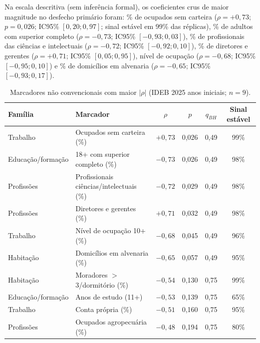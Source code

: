 \documentclass[12pt,a4paper]{article}
\begin{document}
Na escala descritiva (sem inferência formal), os coeficientes crus de maior magnitude no desfecho primário foram: \% de ocupados sem carteira ($\rho = +0{,}73$; $p = 0{,}026$; IC95\% $[0{,}20; 0{,}97]$; sinal estável em 99\% das réplicas), \% de adultos com superior completo ($\rho = -0{,}73$; IC95\% $[-0{,}93; 0{,}03]$), \% de profissionais das ciências e intelectuais ($\rho = -0{,}72$; IC95\% $[-0{,}92; 0{,}10]$), \% de diretores e gerentes ($\rho = +0{,}71$; IC95\% $[0{,}05; 0{,}95]$), nível de ocupação ($\rho = -0{,}68$; IC95\% $[-0{,}95; 0{,}10]$) e \% de domicílios em alvenaria ($\rho = -0{,}65$; IC95\% $[-0{,}93; 0{,}17]$).

\begin{table}[h!]
\centering
\caption{Marcadores não convencionais com maior $|\rho|$ (IDEB 2025 anos iniciais; $n = 9$).}
\small
\begin{tabular}{l l c c c c}
\hline
Família & Marcador & $\rho$ & $p$ & $q_{BH}$ & Sinal estável \\
\hline
Trabalho & Ocupados sem carteira (\%) & $+0{,}73$ & 0,026 & 0,49 & 99\% \\
Educação/formação & 18+ com superior completo (\%) & $-0{,}73$ & 0,026 & 0,49 & 98\% \\
Profissões & Profissionais ciências/intelectuais (\%) & $-0{,}72$ & 0,029 & 0,49 & 98\% \\
Profissões & Diretores e gerentes (\%) & $+0{,}71$ & 0,032 & 0,49 & 98\% \\
Trabalho & Nível de ocupação 10+ (\%) & $-0{,}68$ & 0,045 & 0,49 & 96\% \\
Habitação & Domicílios em alvenaria (\%) & $-0{,}65$ & 0,057 & 0,49 & 95\% \\
Habitação & Moradores $>$3/dormitório (\%) & $-0{,}54$ & 0,130 & 0,75 & 99\% \\
Educação/formação & Anos de estudo (11+) & $-0{,}53$ & 0,139 & 0,75 & 65\% \\
Trabalho & Conta própria (\%) & $-0{,}51$ & 0,160 & 0,75 & 95\% \\
Profissões & Ocupados agropecuária (\%) & $-0{,}48$ & 0,194 & 0,75 & 80\% \\
\hline
\end{tabular}
\end{table}
\end{document}
